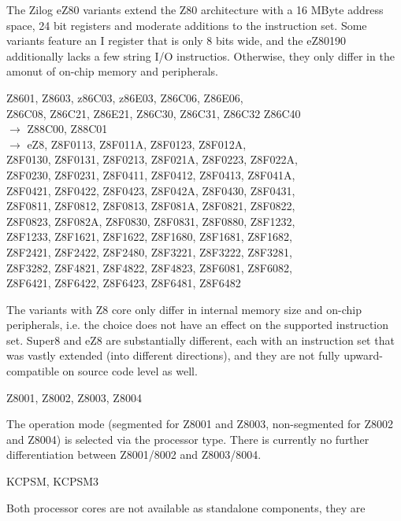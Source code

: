 \documentclass[12pt,twoside]{report}
\begin{document}
The Zilog eZ80 variants extend the Z80 architecture with a 16
MByte address space, 24 bit registers and moderate additions to
the instruction set.  Some variants feature an I register that
is only 8 bits wide, and the eZ80190 additionally lacks a few
string I/O instructios.  Otherwise, they only differ in the
amonut of on-chip memory and peripherals.
\begin{cpulist}
   Z8601, Z8603, z86C03, z86E03, Z86C06, Z86E06, \\
\> Z86C08, Z86C21, Z86E21, Z86C30, Z86C31, Z86C32 Z86C40 \\
\> $\rightarrow$ Z88C00, Z88C01 \\
\> $\rightarrow$ eZ8, Z8F0113, Z8F011A, Z8F0123, Z8F012A, \\
\> Z8F0130, Z8F0131, Z8F0213, Z8F021A, Z8F0223, Z8F022A, \\
\> Z8F0230, Z8F0231, Z8F0411, Z8F0412, Z8F0413, Z8F041A, \\
\> Z8F0421, Z8F0422, Z8F0423, Z8F042A, Z8F0430, Z8F0431, \\
\> Z8F0811, Z8F0812, Z8F0813, Z8F081A, Z8F0821, Z8F0822, \\
\> Z8F0823, Z8F082A, Z8F0830, Z8F0831, Z8F0880, Z8F1232, \\
\> Z8F1233, Z8F1621, Z8F1622, Z8F1680, Z8F1681, Z8F1682, \\
\> Z8F2421, Z8F2422, Z8F2480, Z8F3221, Z8F3222, Z8F3281, \\
\> Z8F3282, Z8F4821, Z8F4822, Z8F4823, Z8F6081, Z8F6082, \\
\> Z8F6421, Z8F6422, Z8F6423, Z8F6481, Z8F6482
\end{cpulist}
The variants with Z8 core only differ in internal memory size and
on-chip peripherals, i.e. the choice does not have an effect on the
supported instruction set.  Super8 and eZ8 are substantially different,
each with an instruction set that was vastly extended (into different
directions), and they are not fully upward-compatible on source code
level as well.
\begin{cpulist}
   Z8001, Z8002, Z8003, Z8004
\end{cpulist}
The operation mode (segmented for Z8001 and Z8003, non-segmented for
Z8002 and Z8004) is selected via the processor type.  There is currently
no further differentiation between Z8001/8002 and Z8003/8004.
\begin{cpulist}
   KCPSM, KCPSM3
\end{cpulist}
Both processor cores are not available as standalone components, they are
\end{document}
